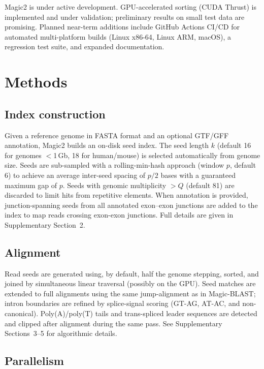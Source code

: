 \documentclass[11pt]{article}
\begin{document}
Magic2 is under active development.
GPU-accelerated sorting (CUDA Thrust) is implemented and under
validation; preliminary results on small test data are promising.
Planned near-term additions include GitHub Actions CI/CD for automated
multi-platform builds (Linux x86-64, Linux ARM, macOS), a regression
test suite, and expanded documentation.

\section*{Methods}

\subsection*{Index construction}

Given a reference genome in FASTA format and an optional GTF/GFF
annotation, Magic2 builds an on-disk seed index.
The seed length $k$ (default 16 for genomes $<$1\,Gb, 18 for
human/mouse) is selected automatically from genome size.
Seeds are sub-sampled with a rolling-min-hash approach (window $p$,
default 6) to achieve an average inter-seed spacing of $p/2$ bases
with a guaranteed maximum gap of $p$.
Seeds with genomic multiplicity $>Q$ (default 81) are discarded to
limit hits from repetitive elements.
When annotation is provided, junction-spanning seeds from all annotated
exon--exon junctions are added to the index to map
reads crossing exon-exon junctions.
Full details are given in Supplementary Section~2.

\subsection*{Alignment}

Read seeds are generated using, by default, half the genome stepping,
sorted, and joined by simultaneous
linear traversal (possibly on the GPU).
Seed matches are extended to full alignments using the same jump-alignment
as in Magic-BLAST; intron boundaries are refined by splice-signal
scoring (GT-AG, AT-AC, and non-canonical).
Poly(A)/poly(T) tails and trans-spliced leader sequences are detected
and clipped after alignment during the same pass.
See Supplementary Sections~3--5 for algorithmic details.

\subsection*{Parallelism}
\end{document}
